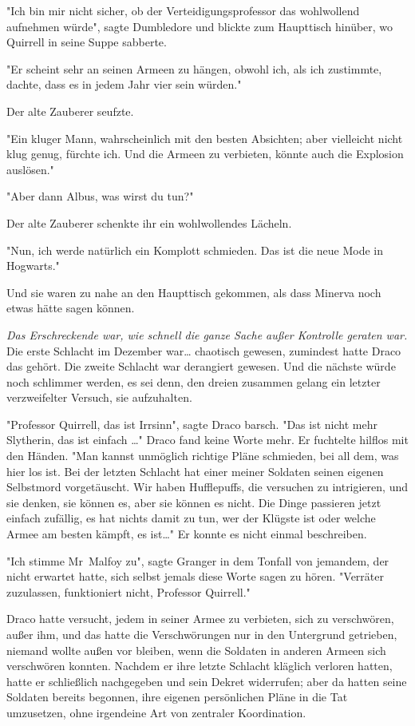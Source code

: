 {"Ich bin mir nicht sicher, ob der Verteidigungsprofessor das wohlwollend aufnehmen würde", sagte Dumbledore und blickte zum Haupttisch hinüber, wo Quirrell in seine Suppe sabberte.

"Er scheint sehr an seinen Armeen zu hängen, obwohl ich, als ich zustimmte, dachte, dass es in jedem Jahr vier sein würden."

Der alte Zauberer seufzte.

"Ein kluger Mann, wahrscheinlich mit den besten Absichten; aber vielleicht nicht klug genug, fürchte ich. Und die Armeen zu verbieten, könnte auch die Explosion auslösen."

"Aber dann Albus, was wirst du tun?"

Der alte Zauberer schenkte ihr ein wohlwollendes Lächeln.

"Nun, ich werde natürlich ein Komplott schmieden. Das ist die neue Mode in Hogwarts."

Und sie waren zu nahe an den Haupttisch gekommen, als dass Minerva noch etwas hätte sagen können.

\emph{Das Erschreckende war, wie schnell die ganze Sache außer Kontrolle geraten war.} Die erste Schlacht im Dezember war… chaotisch gewesen, zumindest hatte Draco das gehört. Die zweite Schlacht war derangiert gewesen. Und die nächste würde noch schlimmer werden, es sei denn, den dreien zusammen gelang ein letzter verzweifelter Versuch, sie aufzuhalten.

"Professor Quirrell, das ist Irrsinn", sagte Draco barsch. "Das ist nicht mehr Slytherin, das ist einfach …" Draco fand keine Worte mehr. Er fuchtelte hilflos mit den Händen. "Man kannst unmöglich richtige Pläne schmieden, bei all dem, was hier los ist. Bei der letzten Schlacht hat einer meiner Soldaten seinen eigenen Selbstmord vorgetäuscht. Wir haben Hufflepuffs, die versuchen zu intrigieren, und sie denken, sie können es, aber sie können es nicht. Die Dinge passieren jetzt einfach zufällig, es hat nichts damit zu tun, wer der Klügste ist oder welche Armee am besten kämpft, es ist…" Er konnte es nicht einmal beschreiben.

"Ich stimme Mr~Malfoy zu", sagte Granger in dem Tonfall von jemandem, der nicht erwartet hatte, sich selbst jemals diese Worte sagen zu hören. "Verräter zuzulassen, funktioniert nicht, Professor Quirrell."

Draco hatte versucht, jedem in seiner Armee zu verbieten, sich zu verschwören, außer ihm, und das hatte die Verschwörungen nur in den Untergrund getrieben, niemand wollte außen vor bleiben, wenn die Soldaten in anderen Armeen sich verschwören konnten. Nachdem er ihre letzte Schlacht kläglich verloren hatten, hatte er schließlich nachgegeben und sein Dekret widerrufen; aber da hatten seine Soldaten bereits begonnen, ihre eigenen persönlichen Pläne in die Tat umzusetzen, ohne irgendeine Art von zentraler Koordination.

}
